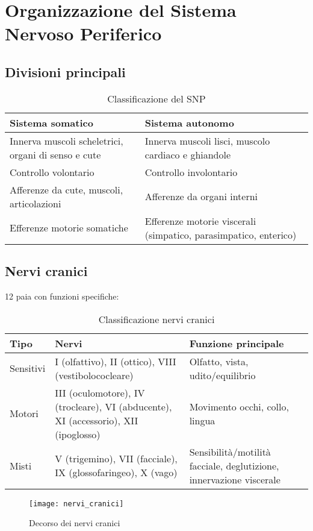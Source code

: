 \documentclass[11pt]{article}
\begin{document}
\section*{Organizzazione del Sistema Nervoso Periferico}

\subsection*{Divisioni principali}
\begin{table}[h]
\centering
\caption{Classificazione del SNP}
\begin{tabular}{p{6cm}p{8cm}}
\toprule
\textbf{Sistema somatico} & \textbf{Sistema autonomo} \\
\midrule
Innerva muscoli scheletrici, organi di senso e cute & Innerva muscoli lisci, muscolo cardiaco e ghiandole \\
Controllo volontario & Controllo involontario \\
Afferenze da cute, muscoli, articolazioni & Afferenze da organi interni \\
Efferenze motorie somatiche & Efferenze motorie viscerali (simpatico, parasimpatico, enterico) \\
\bottomrule
\end{tabular}
\end{table}

\subsection*{Nervi cranici}
12 paia con funzioni specifiche:
\begin{table}[h]
\centering
\caption{Classificazione nervi cranici}
\begin{tabular}{lll}
\toprule
\textbf{Tipo} & \textbf{Nervi} & \textbf{Funzione principale} \\
\midrule
Sensitivi & I (olfattivo), II (ottico), VIII (vestibolococleare) & Olfatto, vista, udito/equilibrio \\
Motori & III (oculomotore), IV (trocleare), VI (abducente), XI (accessorio), XII (ipoglosso) & Movimento occhi, collo, lingua \\
Misti & V (trigemino), VII (facciale), IX (glossofaringeo), X (vago) & Sensibilità/motilità facciale, deglutizione, innervazione viscerale \\
\bottomrule
\end{tabular}
\end{table}
\begin{figure}[h]
    \centering
    \texttt{[image: nervi\_cranici]} %
    \caption{Decorso dei nervi cranici}
    \label{fig:nervi_cranici}
\end{figure}
\end{document}
